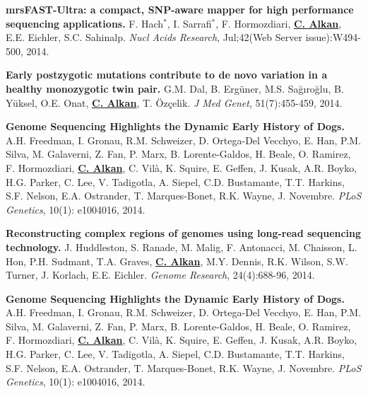 \documentclass[margin,line]{res}
\begin{document}
\begin{resume}
  \vspace{-.2cm}        
  {\bf mrsFAST-Ultra: a compact, SNP-aware mapper for high performance sequencing applications.}
    F. Hach$^*$,
    I. Sarrafi$^*$,
    F. Hormozdiari,
    {\bf {\underline {C. Alkan}}},
    E.E. Eichler,   S.C. Sahinalp.
    {\em Nucl Acids Research}, Jul;42(Web Server issue):W494-500, 2014.

  \vspace{-.2cm}        
         {\bf Early postzygotic mutations contribute to de novo variation in a healthy monozygotic twin pair.}
         G.M. Dal, B. Ergüner, M.S. Sağıroğlu, B. Yüksel, O.E. Onat, {\bf {\underline {C. Alkan}}}, T. Özçelik. 
         {\em J Med Genet}, 51(7):455-459, 2014.

  \vspace{-.2cm}        
         {\bf Genome Sequencing Highlights the Dynamic Early History of Dogs.} 
         A.H. Freedman, I. Gronau, R.M. Schweizer, D. Ortega-Del Vecchyo, E. Han, P.M. Silva, 
         M. Galaverni, Z. Fan, P. Marx, B. Lorente-Galdos, H. Beale, O. Ramirez, F. Hormozdiari, 
         {\bf {\underline {C. Alkan}}}, 
         C. Vilà, K. Squire, E. Geffen, J. Kusak, A.R. Boyko, H.G. Parker, 
         C. Lee, V. Tadigotla, A. Siepel, C.D. Bustamante, T.T. Harkins, S.F. Nelson, 
         E.A. Ostrander, T. Marques-Bonet, R.K. Wayne, J. Novembre. 
         {\em PLoS Genetics}, 10(1): e1004016, 2014.


 \vspace{-.2cm}        
        {\bf Reconstructing complex regions of genomes using long-read sequencing technology.}
         J. Huddleston, S. Ranade, M. Malig, F. Antonacci, M. Chaisson, L. Hon, P.H. Sudmant, T.A. Graves, 
         {\bf {\underline{C. Alkan}}}, M.Y. Dennis, R.K. Wilson, S.W. Turner, J. Korlach, E.E. Eichler. 
         {\em Genome Research},  24(4):688-96, 2014.

 \vspace{-.2cm}        
        {\bf Genome Sequencing Highlights the Dynamic Early History of Dogs.}
        A.H. Freedman, I. Gronau, R.M. Schweizer, D. Ortega-Del Vecchyo, E. Han, P.M. Silva, M. Galaverni, Z. Fan, P. Marx, B. Lorente-Galdos, H. Beale, O. Ramirez, F. Hormozdiari, 
        {\bf {\underline{C. Alkan}}}, C. Vilà, K. Squire, E. Geffen, J. Kusak, A.R. Boyko, H.G. Parker, C. Lee, V. Tadigotla, A. Siepel, C.D. Bustamante, T.T. Harkins, 
        S.F. Nelson, E.A. Ostrander, T. Marques-Bonet, R.K. Wayne, J. Novembre. 
        {\em PLoS Genetics}, 10(1): e1004016, 2014.



\end{resume}
\end{document}
